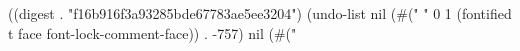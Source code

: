 
((digest . "f16b916f3a93285bde67783ae5ee3204") (undo-list nil (#("
" 0 1 (fontified t face font-lock-comment-face)) . -757) nil (#("%
